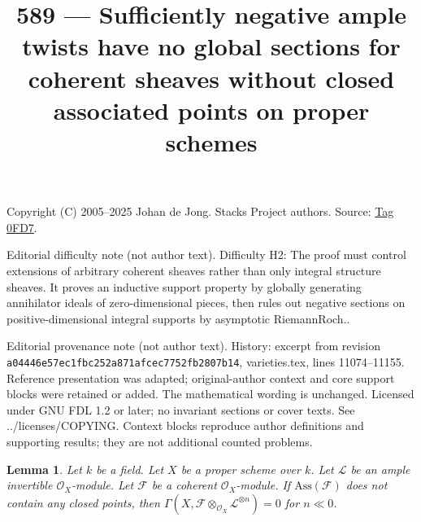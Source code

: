 \documentclass{amsart}
\theoremstyle{plain}
\newtheorem{lemma}[subsection]{Lemma}
\theoremstyle{definition}
\theoremstyle{remark}
\numberwithin{equation}{subsection}
\begin{document}
\title[Stacks Project, Tag 0FD7]{589 --- Sufficiently negative ample twists have no global sections for coherent sheaves without closed associated points on proper schemes}
\maketitle
\noindent Copyright (C) 2005--2025 Johan de Jong. Stacks Project authors. Source: \href{https://stacks.math.columbia.edu/tag/0FD7}{Tag 0FD7}.

\noindent Editorial difficulty note (not author text). Difficulty H2: The proof must control extensions of arbitrary coherent sheaves rather than only integral structure sheaves. It proves an inductive support property by globally generating annihilator ideals of zero-dimensional pieces, then rules out negative sections on positive-dimensional integral supports by asymptotic Riemann\textendash{}Roch..

\noindent Editorial provenance note (not author text). History: excerpt from revision \texttt{a0444\allowbreak 6e57e\allowbreak c1fbc\allowbreak 252a8\allowbreak 71afc\allowbreak ec775\allowbreak 2fb28\allowbreak 07b14}, varieties.tex, lines 11074--11155. Reference presentation was adapted; original-author context and core support blocks were retained or added. The mathematical wording is unchanged. Licensed under GNU FDL 1.2 or later; no invariant sections or cover texts. See ../licenses/COPYING. Context blocks reproduce author definitions and supporting results; they are not additional counted problems.

\begin{lemma}
\label{lemma-vanishin-h0-negative}
Let $k$ be a field. Let $X$ be a proper scheme over $k$. Let $\mathcal{L}$
be an ample invertible $\mathcal{O}_X$-module. Let $\mathcal{F}$ be a
coherent $\mathcal{O}_X$-module. If $\text{Ass}(\mathcal{F})$ does not
contain any closed points, then
$\Gamma(X, \mathcal{F} \otimes_{\mathcal{O}_X} \mathcal{L}^{\otimes n}) = 0$
for $n \ll 0$.
\end{lemma}
\end{document}
